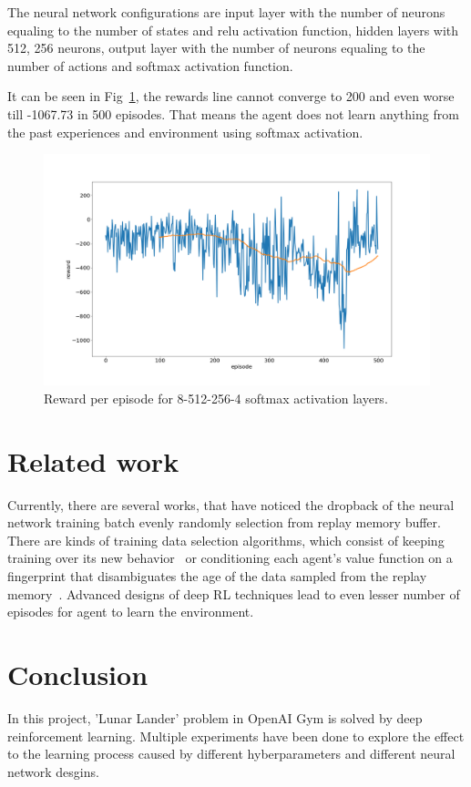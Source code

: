 \documentclass[conference]{IEEEtran}
\begin{document}
The neural network configurations are input layer with the number of neurons equaling to the number of states and relu activation function, hidden layers with 512, 256 neurons, output layer with the number of neurons equaling to the number of actions and softmax activation function.

It can be seen in Fig~\ref{fig15}, the rewards line cannot converge to 200 and even worse till -1067.73 in 500 episodes. That means the agent does not learn anything from the past experiences and environment using softmax activation.

\begin{figure}[htbp]
\includegraphics[width=\linewidth]{train_softmax.png}
\caption{Reward per episode for 8-512-256-4 softmax activation layers.}
\label{fig15}
\end{figure}

\section{Related work}
Currently, there are several works, that have noticed the dropback of the neural network training batch evenly randomly selection from replay memory buffer. There are kinds of training data selection algorithms, which consist of keeping training over its new behavior~\cite{b5} or conditioning each agent's value function on a fingerprint that disambiguates the age of the data sampled from the replay memory~\cite{b6}. Advanced designs of deep RL techniques lead to even lesser number of episodes for agent to learn the environment.

\section{Conclusion}
In this project, 'Lunar Lander' problem in OpenAI Gym is solved by deep reinforcement learning. Multiple experiments have been done to explore the effect to the learning process caused by different hyberparameters and different neural network desgins. 
\end{document}
